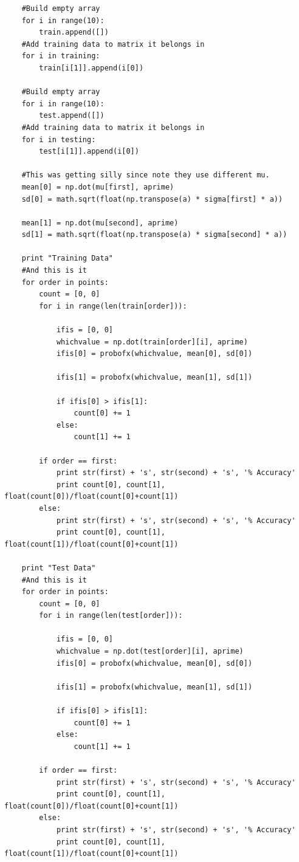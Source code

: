 \documentclass[paper=a4, fontsize=11pt]{scrartcl} %
\numberwithin{equation}{section} %
\numberwithin{figure}{section} %
\numberwithin{table}{section} %
\theoremstyle{statement}
\begin{document}
\begin{verbatim}
    #Build empty array
    for i in range(10):
        train.append([])    
    #Add training data to matrix it belongs in
    for i in training:
        train[i[1]].append(i[0])

    #Build empty array
    for i in range(10):
        test.append([])    
    #Add training data to matrix it belongs in
    for i in testing:
        test[i[1]].append(i[0])              
    
    #This was getting silly since note they use different mu.        
    mean[0] = np.dot(mu[first], aprime)
    sd[0] = math.sqrt(float(np.transpose(a) * sigma[first] * a))
    
    mean[1] = np.dot(mu[second], aprime)
    sd[1] = math.sqrt(float(np.transpose(a) * sigma[second] * a))
    
    print "Training Data"
    #And this is it
    for order in points:
        count = [0, 0]
        for i in range(len(train[order])):
            
            ifis = [0, 0]
            whichvalue = np.dot(train[order][i], aprime)
            ifis[0] = probofx(whichvalue, mean[0], sd[0])
            
            ifis[1] = probofx(whichvalue, mean[1], sd[1])
        
            if ifis[0] > ifis[1]:
                count[0] += 1
            else:
                count[1] += 1
                
        if order == first:
            print str(first) + 's', str(second) + 's', '% Accuracy'
            print count[0], count[1], float(count[0])/float(count[0]+count[1])
        else:
            print str(first) + 's', str(second) + 's', '% Accuracy'
            print count[0], count[1], float(count[1])/float(count[0]+count[1])
            
    print "Test Data"
    #And this is it
    for order in points:
        count = [0, 0]
        for i in range(len(test[order])):
            
            ifis = [0, 0]
            whichvalue = np.dot(test[order][i], aprime)
            ifis[0] = probofx(whichvalue, mean[0], sd[0])
            
            ifis[1] = probofx(whichvalue, mean[1], sd[1])
        
            if ifis[0] > ifis[1]:
                count[0] += 1
            else:
                count[1] += 1
                
        if order == first:
            print str(first) + 's', str(second) + 's', '% Accuracy'
            print count[0], count[1], float(count[0])/float(count[0]+count[1])
        else:
            print str(first) + 's', str(second) + 's', '% Accuracy'
            print count[0], count[1], float(count[1])/float(count[0]+count[1])
\end{verbatim}
\end{document}

